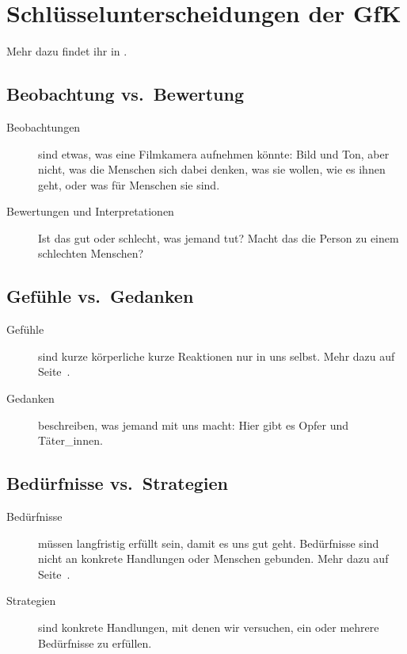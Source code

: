 \section{Schlüsselunterscheidungen der GfK}
\label{gfk-schluesselunterscheidungen}

Mehr dazu findet ihr in \cite[S.~35~f]{gfk-dummies}.

\subsection{Beobachtung vs.~Bewertung}

\begin{description}
    \item[Beobachtungen] sind etwas, was eine Filmkamera aufnehmen könnte: Bild und Ton, aber nicht, was die Menschen sich dabei denken, was sie wollen, wie es ihnen geht, oder was für Menschen sie sind.
    \item[Bewertungen und Interpretationen] Ist das gut oder schlecht, was jemand tut? Macht das die Person zu einem schlechten Menschen?
\end{description}

\subsection{Gefühle vs.~Gedanken}

\begin{description}
    \item[Gefühle] sind kurze körperliche kurze Reaktionen nur in uns selbst. Mehr dazu auf Seite~\pageref{gefuehle}.
    \item[Gedanken] beschreiben, was jemand mit uns macht: Hier gibt es Opfer und Täter\_innen.
\end{description}

\subsection{Bedürfnisse vs.~Strategien}

\begin{description}
    \item[Bedürfnisse] müssen langfristig erfüllt sein, damit es uns gut geht. Bedürfnisse sind nicht an konkrete Handlungen oder Menschen gebunden. Mehr dazu auf Seite~\pageref{beduerfnisse}.
    \item[Strategien] sind konkrete Handlungen, mit denen wir versuchen, ein oder mehrere Bedürfnisse zu erfüllen.
\end{description}
